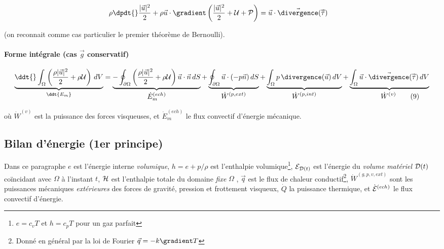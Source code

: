 \begin{equation}
		\rho \dpdt{} \frac{ |\vec{u}|^2}{2} 
		+ \rho \vec{u} \cdot \gradient \left( \frac{ |\vec{u}|^2}{2} + {\cal U} +  {\cal P} \right) 
		= 
		 \vec{u} \cdot \vec{\divergence} ( \mytensor{\tau} ) \quad 
\end{equation}

(on reconnait comme cas particulier le premier théorème de Bernoulli).



\paragraph{Forme intégrale (cas $\vec g$ conservatif) }
	\begin{equation*}
		\underbrace{
		\ddt{} \int_{\Omega}  \left( \frac{\rho |\vec{u}|^2}{2} + \rho {\cal U} \right) \, dV
		}_{\ddt {E_m} }	
		= 
		\underbrace{
		-  \oint_{\partial \Omega} \left( \frac{\rho |\vec{u}|^2}{2} + \rho {\cal U} \right)  \vec u \cdot \vec n \, dS
		}_{\displaystyle \dot E_m^{(ech)} }
		+ 
		\underbrace{
		 \oint_{\partial \Omega}   \vec u \cdot (-p \vec n) \, dS
		}_{\displaystyle \dot W^{(p,ext)} }
		+ 
		\underbrace{
		\int_{\Omega} p \, \divergence (\vec{u}) \, dV 
		}_{\displaystyle \dot W^{(p,int)} }
 + 
		\underbrace{
		\int_{\Omega}
 \vec{u} \cdot \vec{\divergence} ( \mytensor{\tau} ) \, dV}_{\qquad \quad \displaystyle \dot W^{(v)}  \qquad (9) } 
		\label{eq:bilan_global_eulerien_ec}
	\end{equation*}


où $\displaystyle \dot W^{(v)}$ est la puissance des forces visqueuses,  et 
$\dot E_m^{(ech)}$ le flux convectif d'énergie mécanique.


\subsection{Bilan d'énergie (1er principe)}

Dans ce paragraphe $e$ est l'énergie interne {\em volumique}, $h = e+p/\rho$ est l'enthalpie volumique\footnote{ $e = c_v T$ et $h = c_p T$ pour un gaz parfait},  ${\cal E}_{{\cal D}(t)}$ est l'énergie du {\em volume matériel} ${\cal D}(t)$ coïncidant avec $\Omega$ à l'instant $t$, $\cal H$ est l'enthalpie totale du domaine {\em fixe} $\Omega$ , $\vec q$ est le flux de chaleur conductif\footnote{ Donné en général par la loi de Fourier $\vec{q}=-k \gradient T$ }, $\dot W^{(g,p,v,ext)}$ sont les puissances mécaniques {\em extérieures} des forces de gravité, pression et frottement visqueux, $\dot Q$ la puissance thermique, et ${\dot{\cal E}^{(ech)}}$ le flux convectif d'énergie.


